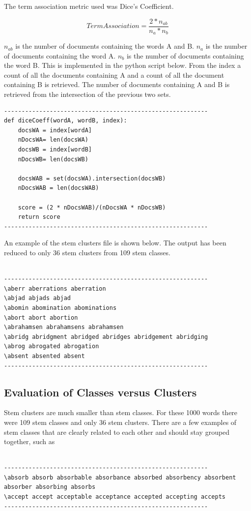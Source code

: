 \documentclass[letterpaper,12pt]{article}
\begin{document}
The term association metric used was Dice's Coefficient. 

$$Term Association = \frac{2*n_{ab}}{ n_a * n_b}  $$

$n_{ab}$ is the number of documents containing the words A and B. $ n_a$ is the number of documents containing the word A. $ n_b$ is the number of documents containing the word B. 
This is implemented in the python script below. From the index a count of all the documents containing A and a count of all the document containing B is retrieved. The number of documents containing A and B is retrieved from the intersection of the previous two sets.

\begin{lstlisting}[breaklines]
----------------------------------------------------------
def diceCoeff(wordA, wordB, index):
    docsWA = index[wordA]
    nDocsWA= len(docsWA)
    docsWB = index[wordB]
    nDocsWB= len(docsWB)

    docsWAB = set(docsWA).intersection(docsWB)
    nDocsWAB = len(docsWAB)

    score = (2 * nDocsWAB)/(nDocsWA * nDocsWB)
    return score
----------------------------------------------------------
\end{lstlisting}


An example of the stem clusters file is shown below. The output has been reduced to only 36 stem clusters from 109 stem classes.
\begin{lstlisting}[breaklines]

----------------------------------------------------------
\aberr aberrations aberration 
\abjad abjads abjad 
\abomin abomination abominations 
\abort abort abortion 
\abrahamsen abrahamsens abrahamsen 
\abridg abridgment abridged abridges abridgement abridging 
\abrog abrogated abrogation 
\absent absented absent 
----------------------------------------------------------
\end{lstlisting}


\subsection{Evaluation of Classes versus Clusters}

Stem clusters are much smaller than stem classes. For these 1000 words there were 109 stem classes and only 36 stem clusters.
There are a few examples of stem classes that are clearly related to each other and should stay grouped together, such as 
\begin{lstlisting}[breaklines]

----------------------------------------------------------
\absorb absorb absorbable absorbance absorbed absorbency absorbent absorber absorbing absorbs 
\accept accept acceptable acceptance accepted accepting accepts 
----------------------------------------------------------
\end{lstlisting}
\end{document}
